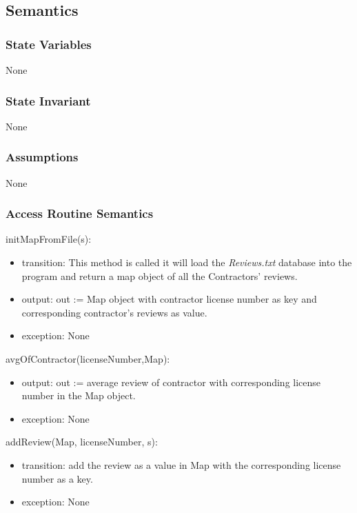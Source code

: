 \documentclass[12pt]{scrartcl}
\begin{document}
\subsection {Semantics}


\subsubsection {State Variables}

None

\subsubsection {State Invariant}

None

\subsubsection {Assumptions}

None

\subsubsection {Access Routine Semantics}

initMapFromFile(s):
\begin{itemize}
\item transition:  This method is called it will load the \textit{Reviews.txt} database into the program and return a map object of all the Contractors' reviews.
\item output: out := Map object with contractor license number as key and corresponding contractor's reviews as value.
\item exception: None
\end{itemize}


avgOfContractor(licenseNumber,Map):
\begin{itemize}
\item output: out := average review of contractor with corresponding license number in the Map object.
\item exception: None
\end{itemize}

addReview(Map, licenseNumber, s):
\begin{itemize}
\item transition: add the review as a value in Map with the corresponding license number as a key.
\item exception: None
\end{itemize}
\end{document}

